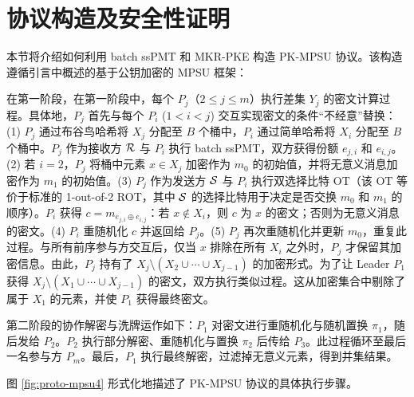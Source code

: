 \section{协议构造及安全性证明}

本节将介绍如何利用 batch ssPMT 和 MKR-PKE 构造 PK-MPSU 协议。该构造遵循引言中概述的基于公钥加密的 MPSU 框架：

在第一阶段，在第一阶段中，每个 $P_j$（$2 \le j \le m$）执行差集 $Y_j$ 的密文计算过程。具体地，$P_j$ 首先与每个 $P_i$ ($1 < i < j$) 交互实现密文的条件“不经意”替换：(1) $P_j$ 通过布谷鸟哈希将 $X_j$ 分配至 $B$ 个桶中，$P_i$ 通过简单哈希将 $X_i$ 分配至 $B$ 个桶中。$P_j$ 作为接收方 $\mathcal{R}$ 与 $P_i$ 执行 batch ssPMT，双方获得份额 $e_{j,i}$ 和 $e_{i,j}$。(2) 若 $i=2$，$P_j$ 将桶中元素 $x \in X_j$ 加密作为 $m_0$ 的初始值，并将无意义消息加密作为 $m_1$ 的初始值。(3) $P_j$ 作为发送方 $\mathcal{S}$ 与 $P_i$ 执行双选择比特 OT（该 OT 等价于标准的 1-out-of-2 ROT，其中 $\mathcal{S}$ 的选择比特用于决定是否交换 $m_0$ 和 $m_1$ 的顺序）。$P_i$ 获得 $c = m_{e_{j,i} \oplus e_{i,j}}$：若 $x \notin X_i$，则 $c$ 为 $x$ 的密文；否则为无意义消息的密文。(4) $P_i$ 重随机化 $c$ 并返回给 $P_j$。(5) $P_j$ 再次重随机化并更新 $m_0$，重复此过程。与所有前序参与方交互后，仅当 $x$ 排除在所有 $X_i$ 之外时，$P_j$ 才保留其加密信息。由此，$P_j$ 持有了 $X_j \setminus (X_2 \cup \cdots \cup X_{j-1})$ 的加密形式。为了让 Leader $P_1$ 获得 $X_j \setminus (X_1 \cup \cdots \cup X_{j-1})$ 的密文，双方执行类似过程。这从加密集合中剔除了属于 $X_1$ 的元素，并使 $P_1$ 获得最终密文。

第二阶段的协作解密与洗牌运作如下：$P_1$ 对密文进行重随机化与随机置换 $\pi_1$，随后发给 $P_2$。$P_2$ 执行部分解密、重随机化与置换 $\pi_2$ 后传给 $P_3$。此过程循环至最后一名参与方 $P_m$。最后，$P_1$ 执行最终解密，过滤掉无意义元素，得到并集结果。

图 \ref{fig:proto-mpsu4} 形式化地描述了 PK-MPSU 协议的具体执行步骤。

